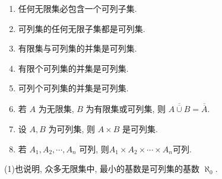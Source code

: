\documentclass[../../main.tex]{subfiles}
\begin{document}
\begin{proposition}[可列集的性质]\label{proposition:可列集的性质}
\begin{enumerate}[(1)]
\item\label{proposition:可列集的性质(1)} 任何无限集必包含一个可列子集.

\item\label{proposition:可列集的性质(2)} 可列集的任何无限子集都是可列集.

\item\label{proposition:可列集的性质(3)} 有限集与可列集的并集是可列集.

\item\label{proposition:可列集的性质(4)} 有限个可列集的并集是可列集.

\item\label{proposition:可列集的性质(5)} 可列个可列集的并集是可列集.

\item\label{proposition:可列集的性质(6)} 若 $A$ 为无限集, $B$ 为有限集或可列集, 则 $\overline{\overline{A \cup B}} = \overline{\overline{A}}$.

\item\label{proposition:可列集的性质(7)} 设 $A, B$ 为可列集, 则 $A \times B$ 是可列集.

\item\label{proposition:可列集的性质(8)} 若 $A_1, A_2, \cdots, A_n$ 可列, 则$A_1 \times A_2 \times \cdots \times A_n$可列. 
\end{enumerate}
\end{proposition}
\begin{note}
(1)也说明, 众多无限集中, 最小的基数是可列集的基数 $\aleph_0$.
\end{note}
\end{document}

